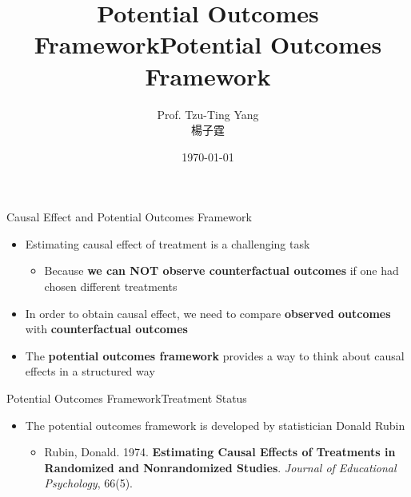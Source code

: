 \documentclass[hyperref={pdfpagelabels=false}]{beamer}
\title[]  
{Potential Outcomes Framework}
\author 
{Prof. Tzu-Ting Yang  \\ 楊子霆}
\institute{Institute of Economics, Academia Sinica  \\ 中央研究院經濟研究所}
\date
 {\today}
\begin{document}
\begin{frame}{}
 \titlepage
\end{frame}





\begin{frame}{Causal Effect and Potential Outcomes Framework}
	\begin{itemize} 
		\item Estimating causal effect of treatment is a challenging task
		\vspace{0.2cm} 
		\begin{itemize} 	
		\item Because \textbf{we can NOT observe counterfactual outcomes} if one had chosen different treatments
		\vspace{0.2cm}
			\end{itemize}
		\item In order to obtain causal effect, we need to compare \textbf{observed outcomes} with \textbf{counterfactual outcomes}
		\vspace{0.2cm}
		\item The \textbf{potential outcomes framework} provides a way to think about causal effects in a structured way
		
	\end{itemize}
	
\end{frame}






\title[]  
{Potential Outcomes Framework}


\author 
{}

\institute{}






\date
{}


\begin{frame}{}
	\titlepage
\end{frame}



\begin{frame}{Potential Outcomes Framework}{Treatment Status}
	\begin{itemize} 
		\item The potential outcomes framework is developed by statistician Donald Rubin
		\vspace{0.2cm}	
			\begin{itemize} 
		\item Rubin, Donald. 1974. \textbf{Estimating Causal Effects of Treatments in Randomized and Nonrandomized Studies}. \textit{Journal of Educational Psychology}, 66(5).
			\end{itemize}
	\end{itemize}
\end{frame}
\end{document}
